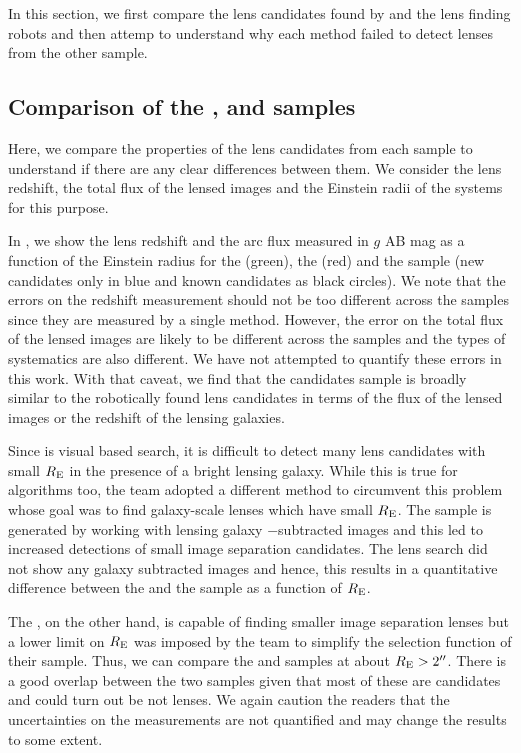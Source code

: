 \documentclass[useAMS,usenatbib,a4paper]{mn2e}
\begin{document}
In this section, we first compare the lens candidates found by
\sw and the lens finding robots and then attemp to understand why each
method failed to detect lenses from the other sample.

\subsection{Comparison of the \rf, \sw and \af samples}
Here, we compare the properties of the lens candidates from each sample
to understand if there are any clear differences between them. We
consider the lens redshift, the total flux of the lensed images and the
Einstein radii of the systems for this purpose.

In , we show the lens redshift and the arc flux
measured in $g$ AB mag as a function of the Einstein radius for the \rf
(green), the \af (red) and the \sw sample (new candidates only in blue
and known candidates as black circles). We note that the errors on the
redshift measurement should not be too different across the samples
since they are measured by a single method. However, the error on the
total flux of the lensed images are likely to be different across the
samples and the types of systematics are also different.  We have not
attempted to quantify these errors in this work. With that caveat, we
find that the \sw candidates sample is broadly similar to the
robotically found lens candidates in terms of the flux of the lensed
images or the redshift of the lensing galaxies.

Since \sw is visual based search, it is difficult to detect many lens
candidates with small $R_{\rm E}$ in the presence of a bright lensing
galaxy. While this is true for algorithms too, the \rf team adopted a
different method to circumvent this problem whose goal was to find
galaxy-scale lenses which have small $R_{\rm E}$. The \rf sample is
generated by working with lensing galaxy $-$subtracted images and this
led to increased detections of small image separation candidates. The
\sw lens search did not show any galaxy subtracted images and hence,
this results in a quantitative difference between the \sw and the \rf
sample as a function of $R_{\rm E}$.

The \af, on the other hand, is capable of finding smaller image
separation lenses but a lower limit on $R_{\rm E}$ was imposed by the
\af team to simplify the selection function of their sample. Thus, we
can compare the \sw and \af samples at about $R_{\rm E}>2\hbox{$^{\prime\prime}$}$. There
is a good overlap between the two samples given that most of these are
candidates and could turn out be not lenses. We again caution the
readers that the uncertainties on the measurements are not quantified
and may change the results to some extent.
\end{document}
